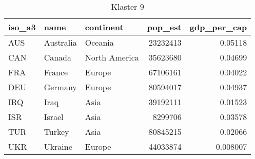 \begin{table}[h!]
   \centering
   \caption{Klaster 9}
   \label{tab:cl9}
   \begin{tabular}{lllrr}
      \toprule
      iso\_a3 & name      & continent     & pop\_est & gdp\_per\_cap \\
      \midrule
      AUS     & Australia & Oceania       & 23232413 & 0.05118       \\
      CAN     & Canada    & North America & 35623680 & 0.04699       \\
      FRA     & France    & Europe        & 67106161 & 0.04022       \\
      DEU     & Germany   & Europe        & 80594017 & 0.04937       \\
      IRQ     & Iraq      & Asia          & 39192111 & 0.01523       \\
      ISR     & Israel    & Asia          & 8299706  & 0.03578       \\
      TUR     & Turkey    & Asia          & 80845215 & 0.02066       \\
      UKR     & Ukraine   & Europe        & 44033874 & 0.008007      \\
      \bottomrule
   \end{tabular}
\end{table}
